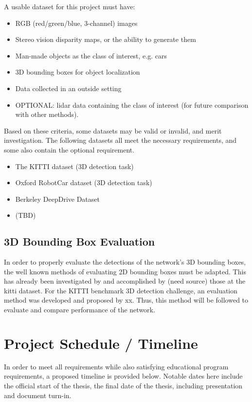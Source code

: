 A usable dataset for this project must have: 
\begin{itemize} \itemsep=-0.5em
    \item RGB (red/green/blue, 3-channel) images
    \item Stereo vision disparity maps, or the ability to generate them
    \item Man-made objects as the class of interest, e.g. cars
    \item 3D bounding boxes for object localization
    \item Data collected in an outside setting
    \item OPTIONAL: lidar data containing the class of interest (for future comparison with other methods).
\end{itemize}

Based on these criteria, some datasets may be valid or invalid, and merit investigation. The following datasets all meet the necessary requirements, and some also contain the optional requirement.
\begin{itemize} \itemsep=-0.5em
    \item The KITTI dataset (3D detection task)
    \item Oxford RobotCar dataset (3D detection task)
    \item Berkeley DeepDrive Dataset
    \item (TBD)
\end{itemize}


\subsection{3D Bounding Box Evaluation}
In order to properly evaluate the detections of the network's 3D bounding boxes, the well known methods of evaluating 2D bounding boxes must be adapted. This has already been investigated by and accomplished by (need source) those at the kitti dataset. For the KITTI benchmark 3D detection challenge, an evaluation method was developed and proposed by xx. Thus, this method will be followed to evaluate and compare performance of the network. 

\section{Project Schedule / Timeline}
In order to meet all requirements while also satisfying educational program requirements, a proposed timeline is provided below. Notable dates here include the official start of the thesis, the final date of the thesis, including presentation and document turn-in.

